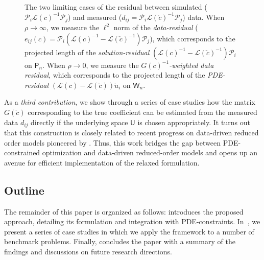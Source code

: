 \documentclass[12pt]{amsart}
\begin{document}
\begin{figure}
\caption{\label{fig:one}
The two limiting cases of the residual between simulated ($\mathcal{P}_i\mathcal{L}(c)^{-1}\mathcal{P}_j$) and measured ($d_{ij}=\mathcal{P}_i\mathcal{L}(\check{c})^{-1}\mathcal{P}_j$) data. When $\rho\rightarrow\infty$, we measure the $\ell^2$ norm of the \emph{data-residual}  ($e_{ij}(c) = \mathcal{P}_i\left(\mathcal{L}(c)^{-1} - \mathcal{L}(\check{c})^{-1}\right)\mathcal{P}_j$), which corresponds to the projected length of the \emph{solution-residual} $\left(\mathcal{L}(c)^{-1}- \mathcal{L}(\check{c})^{-1}\right)\mathcal{P}_i$ on $\mathsf{P}_n$. When $\rho\rightarrow 0$, we measure the \emph{$G(c)^{-1}$-weighted data residual}, which corresponds to the projected length of the \emph{PDE-residual} $\left(\mathcal{L}(c)-\mathcal{L}(\check{c})\right)\check{u}_i$ on  $\mathsf{W}_n $.}
\end{figure}

As a \emph{third contribution}, we show through a series of case studies how the matrix $G(\check{c})$ corresponding to the true coefficient can be estimated from the measured data $d_{ij}$ directly if the underlying space $\mathsf{U}$ is chosen appropriately. It turns out that this construction is closely related to recent progress on data-driven reduced order models pioneered by \cite{Borcea2018,Borcea2020,borcea2022waveform}.
Thus, this work bridges the gap between PDE-constrained optimization and data-driven reduced-order models and opens up an avenue for efficient implementation of the relaxed formulation.

\subsection{Outline}
The remainder of this paper is organized as follows:  introduces the proposed approach, detailing its formulation and integration with PDE-constraints. In~, we present a series of case studies in which we apply the framework to a number of benchmark problems. Finally,  concludes the paper with a summary of the findings and discussions on future research directions.
\end{document}
